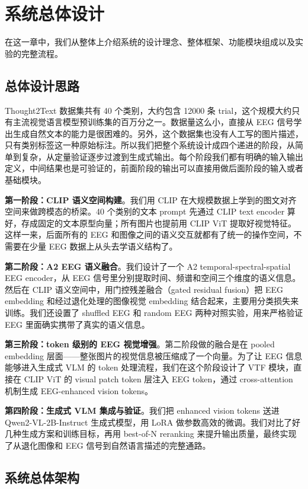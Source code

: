 \section{系统总体设计}

在这一章中，我们从整体上介绍系统的设计理念、整体框架、功能模块组成以及实验的完整流程。

\subsection{总体设计思路}

Thought2Text 数据集共有 40 个类别，大约包含 12000 条 trial，这个规模大约只有主流视觉语言模型预训练集的百万分之一。数据量这么小，直接从 EEG 信号学出生成自然文本的能力是很困难的。另外，这个数据集也没有人工写的图片描述，只有类别标签这一种原始标注。所以我们把整个系统设计成四个递进的阶段，从简单到复杂，从定量验证逐步过渡到生成式输出。每个阶段我们都有明确的输入输出定义，中间结果也是可验证的，前面阶段的输出可以直接用做后面阶段的输入或者基础模块。

\textbf{第一阶段：CLIP 语义空间构建}。我们用 CLIP 在大规模数据上学到的图文对齐空间来做跨模态的桥梁。40 个类别的文本 prompt 先通过 CLIP text encoder 算好，存成固定的文本原型向量；所有图片也提前用 CLIP ViT 提取好视觉特征。这样一来，后面所有的 EEG 和图像之间的语义交互就都有了统一的操作空间，不需要在少量 EEG 数据上从头去学语义结构了。

\textbf{第二阶段：A2 EEG 语义融合}。我们设计了一个 A2 temporal-spectral-spatial EEG encoder，从 EEG 信号里分别提取时间、频谱和空间三个维度的语义信息。然后在 CLIP 语义空间中，用门控残差融合（gated residual fusion）把 EEG embedding 和经过退化处理的图像视觉 embedding 结合起来，主要用分类损失来训练。我们还设置了 shuffled EEG 和 random EEG 两种对照实验，用来严格验证 EEG 里面确实携带了真实的语义信息。

\textbf{第三阶段：token 级别的 EEG 视觉增强}。第二阶段做的融合是在 pooled embedding 层面——整张图片的视觉信息被压缩成了一个向量。为了让 EEG 信息能够进入生成式 VLM 的 token 处理流程，我们在这个阶段设计了 VTF 模块，直接在 CLIP ViT 的 visual patch token 层注入 EEG token，通过 cross-attention 机制生成 EEG-enhanced vision tokens。

\textbf{第四阶段：生成式 VLM 集成与验证}。我们把 enhanced vision tokens 送进 Qwen2-VL-2B-Instruct 生成式模型，用 LoRA 做参数高效的微调。我们对比了好几种生成方案和训练目标，再用 best-of-N reranking 来提升输出质量，最终实现了从退化图像和 EEG 信号到自然语言描述的完整通路。

\subsection{系统总体架构}

